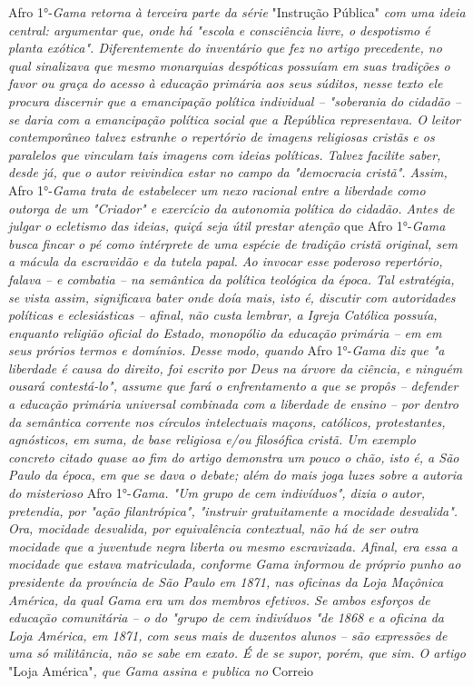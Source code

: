 Afro 1°-\emph{Gama retorna à terceira parte da série} "Instrução
Pública" \emph{com uma ideia central: argumentar que, onde há "escola e
consciência livre, o despotismo é planta exótica". Diferentemente do
inventário que fez no artigo precedente, no qual sinalizava que mesmo
monarquias despóticas possuíam em suas tradições o favor ou graça do
acesso à educação primária aos seus súditos, nesse texto ele procura
discernir que a emancipação política individual -- "soberania do cidadão
-- se daria com a emancipação política social que a República
representava. O leitor contemporâneo talvez estranhe o repertório de
imagens religiosas cristãs e os paralelos que vinculam tais imagens com
ideias políticas. Talvez facilite saber, desde já, que o autor
reivindica estar no campo da "democracia cristã". Assim,} Afro
1°-\emph{Gama trata de estabelecer um nexo racional entre a liberdade
como outorga de um "Criador" e exercício da autonomia política do
cidadão. Antes de julgar o ecletismo das ideias, quiçá seja útil prestar
atenção} que Afro 1°-\emph{Gama busca fincar o pé como intérprete de uma
espécie de tradição cristã original, sem a mácula da escravidão e da
tutela papal. Ao invocar esse poderoso repertório, falava -- e combatia
-- na semântica da política teológica da época. Tal estratégia, se vista
assim, significava bater onde doía mais, isto é, discutir com
autoridades políticas e eclesiásticas -- afinal, não custa lembrar, a
Igreja Católica possuía, enquanto religião oficial do Estado, monopólio
da educação primária -- em em seus prórios termos e domínios. Desse
modo, quando} Afro 1°-\emph{Gama diz que "a liberdade é causa do
direito, foi escrito por Deus na árvore da ciência, e ninguém ousará
contestá-lo", assume que fará o enfrentamento a que se propôs --
defender a educação primária universal combinada com a liberdade de
ensino -- por dentro da semântica corrente nos círculos intelectuais
maçons, católicos, protestantes, agnósticos, em suma, de base religiosa
e/ou filosófica cristã. Um exemplo concreto citado quase ao fim do
artigo demonstra um pouco o chão, isto é, a São Paulo da época, em que
se dava o debate; além do mais joga luzes sobre a autoria do misterioso}
Afro 1°-\emph{Gama. "Um grupo de cem indivíduos", dizia o autor,
pretendia, por "ação filantrópica", "instruir gratuitamente a mocidade
desvalida". Ora, mocidade desvalida, por equivalência contextual, não há
de ser outra mocidade que a juventude negra liberta ou mesmo
escravizada. Afinal, era essa a mocidade que estava matriculada,
conforme Gama informou de próprio punho ao presidente da província de
São Paulo em 1871, nas oficinas da Loja Maçônica América, da qual Gama
era um dos membros efetivos. Se ambos esforços de educação comunitária
-- o do "grupo de cem indivíduos "de 1868 e a oficina da Loja América,
em 1871, com seus mais de duzentos alunos -- são expressões de uma só
militância, não se sabe em exato. É de se supor, porém, que sim. O
artigo} "Loja América"\emph{, que Gama assina e publica no} Correio
